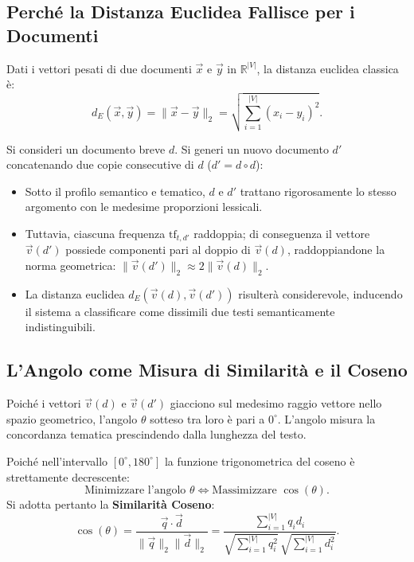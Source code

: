\subsection{Perch\'e la Distanza Euclidea Fallisce per i Documenti}
Dati i vettori pesati di due documenti $\vec{x}$ e $\vec{y}$ in $\mathbb{R}^{|V|}$, la distanza euclidea classica \`e:
\begin{equation}
d_E(\vec{x}, \vec{y}) = \|\vec{x} - \vec{y}\|_2 = \sqrt{\sum_{i=1}^{|V|} (x_i - y_i)^2}.
\end{equation}

\begin{example}
Si consideri un documento breve $d$. Si generi un nuovo documento $d'$ concatenando due copie consecutive di $d$ ($d' = d \circ d$):
\begin{itemize}
    \item Sotto il profilo semantico e tematico, $d$ e $d'$ trattano rigorosamente lo stesso argomento con le medesime proporzioni lessicali.
    \item Tuttavia, ciascuna frequenza $\text{tf}_{t,d'}$ raddoppia; di conseguenza il vettore $\vec{v}(d')$ possiede componenti pari al doppio di $\vec{v}(d)$, raddoppiandone la norma geometrica: $\|\vec{v}(d')\|_2 \approx 2\|\vec{v}(d)\|_2$.
    \item La distanza euclidea $d_E(\vec{v}(d), \vec{v}(d'))$ risulter\`a considerevole, inducendo il sistema a classificare come dissimili due testi semanticamente indistinguibili.
\end{itemize}
\end{example}

\subsection{L'Angolo come Misura di Similarit\`a e il Coseno}
Poich\'e i vettori $\vec{v}(d)$ e $\vec{v}(d')$ giacciono sul medesimo raggio vettore nello spazio geometrico, l'angolo $\theta$ sotteso tra loro \`e pari a $0^\circ$. L'angolo misura la concordanza tematica prescindendo dalla lunghezza del testo.

Poich\'e nell'intervallo $[0^\circ, 180^\circ]$ la funzione trigonometrica del coseno \`e strettamente decrescente:
\begin{equation}
\text{Minimizzare l'angolo } \theta \iff \text{Massimizzare } \cos(\theta).
\end{equation}
Si adotta pertanto la \textbf{Similarit\`a Coseno}:
\begin{equation}
\cos(\theta) = \frac{\vec{q} \cdot \vec{d}}{\|\vec{q}\|_2 \|\vec{d}\|_2} = \frac{\sum_{i=1}^{|V|} q_i d_i}{\sqrt{\sum_{i=1}^{|V|} q_i^2} \, \sqrt{\sum_{i=1}^{|V|} d_i^2}}.
\label{eq:cosine-sim}
\end{equation}

